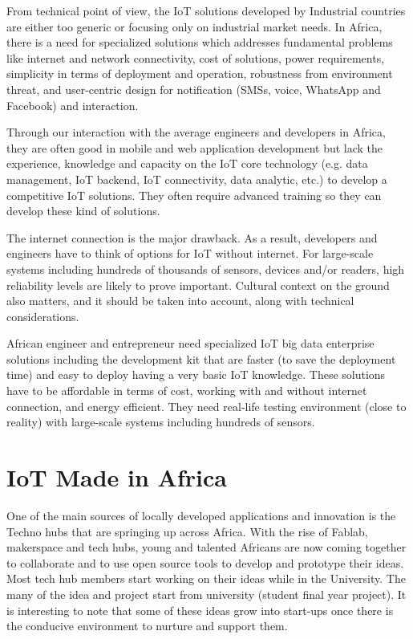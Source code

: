 \documentclass{llncs}
\begin{document}
From technical point of view, the IoT solutions developed by Industrial countries are either too generic or focusing only on industrial market needs.
In Africa, there is a need for specialized solutions which addresses fundamental problems like internet and network connectivity, cost of solutions, power requirements, simplicity in terms of deployment and operation, robustness from environment threat, and user-centric design for notification (SMSs, voice, WhatsApp and Facebook) and interaction.

Through our interaction with the average engineers and developers in Africa, they are often good in mobile and web application development but lack the experience, knowledge and capacity on the IoT core technology (e.g. data management, IoT backend, IoT connectivity, data analytic, etc.) to develop a competitive IoT solutions.
They often require advanced training so they can develop these kind of solutions. 

The internet connection is the major drawback.
As a result, developers and engineers have to think of options for IoT without internet.
For large-scale systems including hundreds of thousands of sensors, devices and/or readers, high reliability levels are likely to prove important.
Cultural context on the ground also matters, and it should be taken into account, along with technical considerations.

African engineer and entrepreneur need specialized IoT big data enterprise solutions including the development kit that are faster (to save the deployment time) and easy to deploy having a very basic IoT knowledge.
These solutions have to be affordable in terms of cost, working with and without internet connection, and energy efficient.
They need real-life testing environment (close to reality) with large-scale systems including hundreds of sensors.

\section{IoT Made in Africa}


One of the main sources of locally developed applications and innovation is the Techno hubs that are springing up across Africa.
With the rise of Fablab, makerspace and tech hubs, young and talented Africans are now coming together to collaborate and to use open source tools to develop and prototype their ideas.  
Most tech hub members start working on their ideas while in the University.
The many of the idea and project start from university (student final year project).
It is interesting to note that some of these ideas grow into start-ups once there is the conducive environment to nurture and support them.
\end{document}
